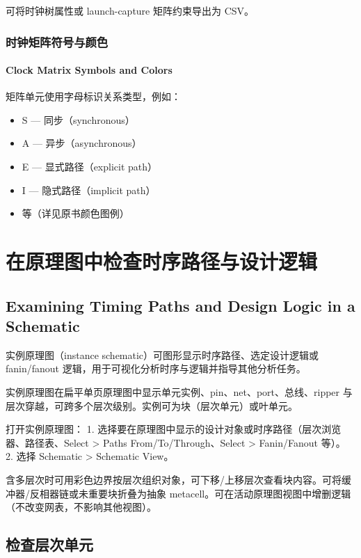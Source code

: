 可将时钟树属性或 launch-capture 矩阵约束导出为 CSV。

\subsubsection{时钟矩阵符号与颜色}
\paragraph*{Clock Matrix Symbols and Colors}

矩阵单元使用字母标识关系类型，例如：
\begin{itemize}
  \item S — 同步（synchronous）
  \item A — 异步（asynchronous）
  \item E — 显式路径（explicit path）
  \item I — 隐式路径（implicit path）
  \item 等（详见原书颜色图例）
\end{itemize}

\section{在原理图中检查时序路径与设计逻辑}
\subsection*{Examining Timing Paths and Design Logic in a Schematic}

实例原理图（instance schematic）可图形显示时序路径、选定设计逻辑或 fanin/fanout 逻辑，用于可视化分析时序与逻辑并指导其他分析任务。

实例原理图在扁平单页原理图中显示单元实例、pin、net、port、总线、ripper 与层次穿越，可跨多个层次级别。实例可为块（层次单元）或叶单元。

打开实例原理图：
1. 选择要在原理图中显示的设计对象或时序路径（层次浏览器、路径表、Select > Paths From/To/Through、Select > Fanin/Fanout 等）。
2. 选择 Schematic > Schematic View。


含多层次时可用彩色边界按层次组织对象，可下移/上移层次查看块内容。可将缓冲器/反相器链或未重要块折叠为抽象 metacell。可在活动原理图视图中增删逻辑（不改变网表，不影响其他视图）。

\subsection{检查层次单元}
